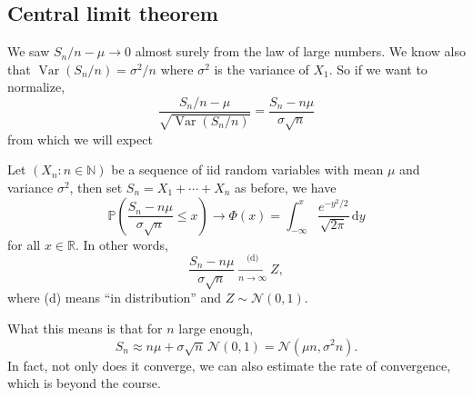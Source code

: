 \subsection{Central limit theorem}
We saw $S_n/n-\mu\to 0$ almost surely from the law of large numbers.
We know also that $\operatorname{Var}(S_n/n)=\sigma^2/n$ where $\sigma^2$ is the variance of $X_1$.
So if we want to normalize,
$$\frac{S_n/n-\mu}{\sqrt{\operatorname{Var}(S_n/n)}}=\frac{S_n-n\mu}{\sigma\sqrt{n}}$$
from which we will expect
\begin{theorem}
    Let $(X_n:n\in\mathbb N)$ be a sequence of iid random variables with mean $\mu$ and variance $\sigma^2$, then set $S_n=X_1+\cdots+X_n$ as before, we have
    $$\mathbb P\left( \frac{S_n-n\mu}{\sigma\sqrt{n}}\le x \right)\to\Phi(x)=\int_{-\infty}^x\frac{e^{-y^2/2}}{\sqrt{2\pi}}\,\mathrm dy$$
    for all $x\in\mathbb R$. In other words, 
    \[
        \frac{S_n-n\mu}{\sigma\sqrt{n}}\xrightarrow[n\to \infty]{\text{(d)}}Z,
    \]
    where (d) means ``in distribution'' and $ Z \sim \mathcal{N}(0,1) $.
\end{theorem}
\begin{note}
    What this means is that for $n$ large enough,
    \[
        S_n\approx n\mu+\sigma\sqrt{n}\,\mathcal N(0,1)=\mathcal N(\mu n,\sigma^2n).
    \]
    In fact, not only does it converge, we can also estimate the rate of convergence, which is beyond the course.
\end{note}
